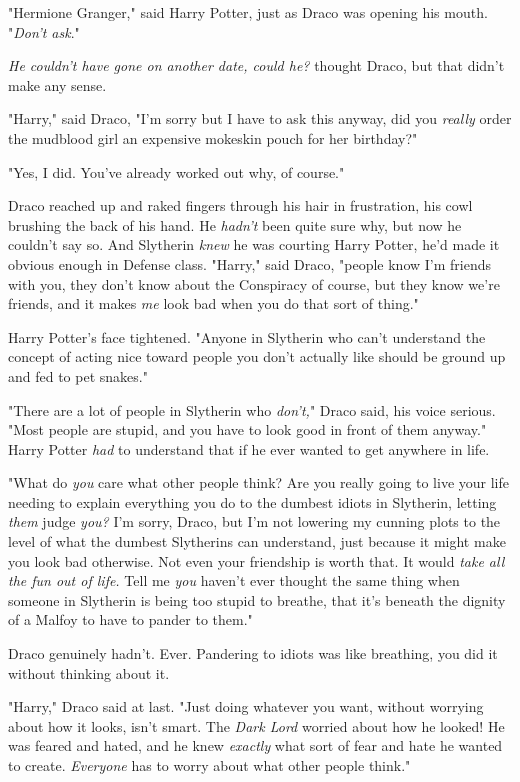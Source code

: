 "Hermione Granger," said Harry Potter, just as Draco was opening his mouth.
"\emph{Don't ask}."

\emph{He couldn't have gone on another date, could he?} thought Draco, but that
didn't make any sense.

"Harry," said Draco, "I'm sorry but I have to ask this anyway, did you
\emph{really} order the mudblood girl an expensive mokeskin pouch for her
birthday?"

"Yes, I did. You've already worked out why, of course."

Draco reached up and raked fingers through his hair in frustration, his cowl
brushing the back of his hand. He \emph{hadn't} been quite sure why, but now he
couldn't say so. And Slytherin \emph{knew} he was courting Harry Potter, he'd
made it obvious enough in Defense class. "Harry," said Draco, "people know I'm
friends with you, they don't know about the Conspiracy of course, but they know
we're friends, and it makes \emph{me} look bad when you do that sort of thing."

Harry Potter's face tightened. "Anyone in Slytherin who can't understand the
concept of acting nice toward people you don't actually like should be ground
up and fed to pet snakes."

"There are a lot of people in Slytherin who \emph{don't,}" Draco said, his
voice serious. "Most people are stupid, and you have to look good in front of
them anyway." Harry Potter \emph{had} to understand that if he ever wanted to
get anywhere in life.

"What do \emph{you} care what other people think? Are you really going to live
your life needing to explain everything you do to the dumbest idiots in
Slytherin, letting \emph{them} judge \emph{you?} I'm sorry, Draco, but I'm not
lowering my cunning plots to the level of what the dumbest Slytherins can
understand, just because it might make you look bad otherwise. Not even your
friendship is worth that. It would \emph{take all the fun out of life.} Tell me
\emph{you} haven't ever thought the same thing when someone in Slytherin is
being too stupid to breathe, that it's beneath the dignity of a Malfoy to have
to pander to them."

Draco genuinely hadn't. Ever. Pandering to idiots was like breathing, you did
it without thinking about it.

"Harry," Draco said at last. "Just doing whatever you want, without worrying
about how it looks, isn't smart. The \emph{Dark Lord} worried about how he
looked! He was feared and hated, and he knew \emph{exactly} what sort of fear
and hate he wanted to create. \emph{Everyone} has to worry about what other
people think."

